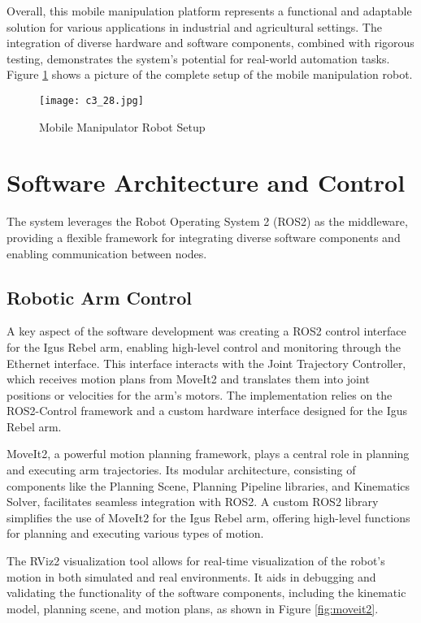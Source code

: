 Overall, this mobile manipulation platform represents a functional and adaptable solution for various applications 
in industrial and agricultural settings. The integration of diverse hardware and software components, combined with
rigorous testing, demonstrates the system's potential for real-world automation tasks.
Figure \ref{fig:setup} shows a picture of the complete setup of the mobile manipulation robot.

\begin{figure}[t]
    \centering
    \texttt{[image: c3\_28.jpg]}
    \caption{Mobile Manipulator Robot Setup}
    \label{fig:setup}
\end{figure}

\section{Software Architecture and Control}

The system leverages the Robot Operating System 2 (ROS2) as the middleware, providing a flexible framework for
integrating diverse software components and enabling communication between nodes.

\subsection{Robotic Arm Control}

A key aspect of the software development was creating a ROS2 control interface for the Igus Rebel arm, enabling 
high-level control and monitoring through the Ethernet interface. This interface interacts with the Joint Trajectory 
Controller, which receives motion plans from MoveIt2 and translates them into joint positions or velocities for 
the arm's motors. The implementation relies on the ROS2-Control framework and a custom hardware interface designed
for the Igus Rebel arm.

MoveIt2, a powerful motion planning framework, plays a central role in planning and executing arm trajectories. 
Its modular architecture, consisting of components like the Planning Scene, Planning Pipeline libraries, and 
Kinematics Solver, facilitates seamless integration with ROS2. A custom ROS2 library simplifies the use of 
MoveIt2 for the Igus Rebel arm, offering high-level functions for planning and executing various types of motion.

The RViz2 visualization tool allows for real-time visualization of the robot's motion in both simulated and real 
environments. It aids in debugging and validating the functionality of the software components, including the 
kinematic model, planning scene, and motion plans, as shown in Figure \ref{fig:moveit2}.

